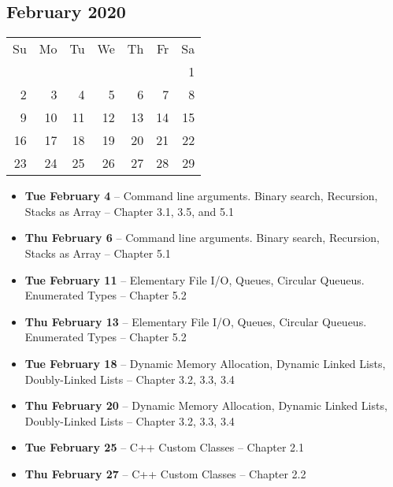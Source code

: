 \documentclass{article}
\begin{document}
\subsection*{February 2020}
\begin{tabular}{rrrrrrr}
Su & Mo & Tu & We & Th & Fr & Sa\\
   &    &    &    &    &    &  1\\ 
 2 &  3 &  4 &  5 &  6 &  7 &  8\\ 
 9 & 10 & 11 & 12 & 13 & 14 & 15\\ 
16 & 17 & 18 & 19 & 20 & 21 & 22\\ 
23 & 24 & 25 & 26 & 27 & 28 & 29\\ 
\end{tabular}

\begin{itemize}
\item \textbf{Tue February  4} 
    -- Command line arguments. Binary search, Recursion, Stacks as
        Array
    -- Chapter 3.1, 3.5, and 5.1
\item \textbf{Thu February  6} 
    -- Command line arguments. Binary search, Recursion, Stacks as
        Array
    -- Chapter 5.1
\item \textbf{Tue February 11} 
    -- Elementary File I/O, Queues, Circular Queueus. Enumerated Types
    -- Chapter 5.2
\item \textbf{Thu February 13} 
    -- Elementary File I/O, Queues, Circular Queueus. Enumerated Types
    -- Chapter 5.2
\item \textbf{Tue February 18} 
    -- Dynamic Memory Allocation, Dynamic Linked Lists, Doubly-Linked
        Lists
    -- Chapter 3.2, 3.3, 3.4
\item \textbf{Thu February 20} 
    -- Dynamic Memory Allocation, Dynamic Linked Lists, Doubly-Linked Lists
    -- Chapter 3.2, 3.3, 3.4
\item \textbf{Tue February 25} 
    -- C++ Custom Classes
    -- Chapter 2.1
\item \textbf{Thu February 27} 
    -- C++ Custom Classes
    -- Chapter 2.2
\end{itemize}
\end{document}
